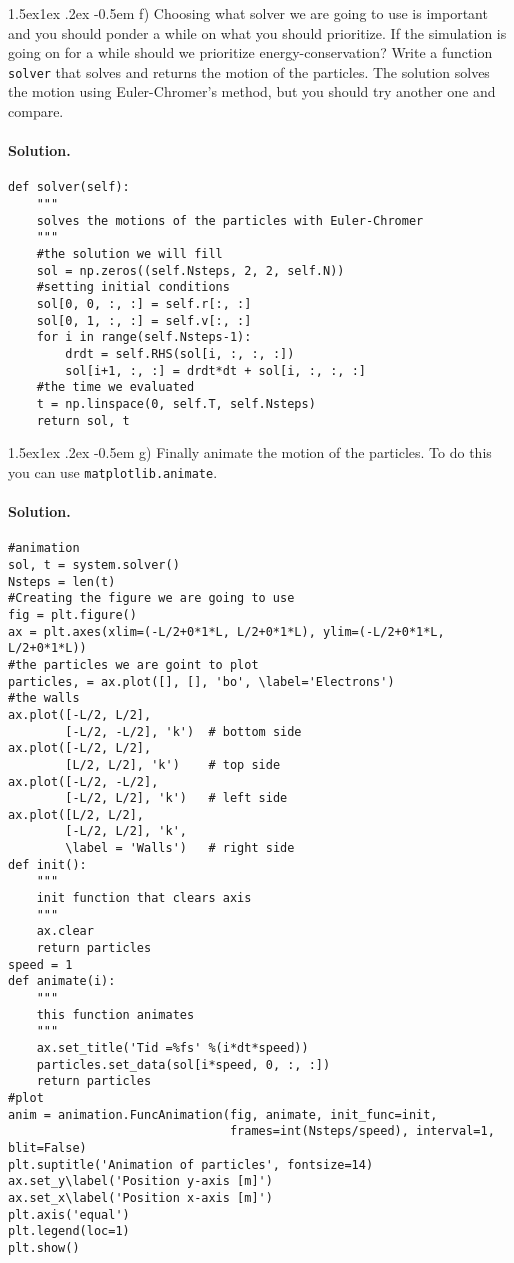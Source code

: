 \documentclass[%
oneside,                 %
final,                   %
10pt]{article}
\makeatletter
\newenvironment{doconceexercise}{}{}
\newcommand\subex{\@startsection{paragraph}{4}{\z@}%
                  {1.5ex\@plus1ex \@minus.2ex}%
                  {-0.5em}%
                  {\normalfont\normalsize\bfseries}}
\makeatother
\begin{document}
\begin{doconceexercise}

\subex{f)}
Choosing what solver we are going to use is important and you should ponder a while on what you should prioritize. If the simulation is going on for a while should we prioritize energy-conservation? Write a function \texttt{solver} that solves and returns the motion of the particles. The solution solves the motion using Euler-Chromer's method, but you should try another one and compare.


\paragraph{Solution.}
\begin{verbatim}
def solver(self):
    """
    solves the motions of the particles with Euler-Chromer
    """
    #the solution we will fill
    sol = np.zeros((self.Nsteps, 2, 2, self.N))
    #setting initial conditions
    sol[0, 0, :, :] = self.r[:, :]
    sol[0, 1, :, :] = self.v[:, :]
    for i in range(self.Nsteps-1):
        drdt = self.RHS(sol[i, :, :, :])
        sol[i+1, :, :] = drdt*dt + sol[i, :, :, :]
    #the time we evaluated
    t = np.linspace(0, self.T, self.Nsteps)
    return sol, t
\end{verbatim}


\subex{g)}
Finally animate the motion of the particles. To do this you can use \texttt{matplotlib.animate}.


\paragraph{Solution.}
\begin{verbatim}
#animation
sol, t = system.solver()
Nsteps = len(t)
#Creating the figure we are going to use
fig = plt.figure()
ax = plt.axes(xlim=(-L/2+0*1*L, L/2+0*1*L), ylim=(-L/2+0*1*L, L/2+0*1*L))
#the particles we are goint to plot
particles, = ax.plot([], [], 'bo', \label='Electrons')
#the walls
ax.plot([-L/2, L/2],
        [-L/2, -L/2], 'k')  # bottom side
ax.plot([-L/2, L/2],
        [L/2, L/2], 'k')    # top side
ax.plot([-L/2, -L/2],
        [-L/2, L/2], 'k')   # left side
ax.plot([L/2, L/2],
        [-L/2, L/2], 'k',
        \label = 'Walls')   # right side
def init():
    """
    init function that clears axis
    """
    ax.clear
    return particles
speed = 1
def animate(i):
    """
    this function animates
    """
    ax.set_title('Tid =%fs' %(i*dt*speed))
    particles.set_data(sol[i*speed, 0, :, :])
    return particles
#plot
anim = animation.FuncAnimation(fig, animate, init_func=init,
                               frames=int(Nsteps/speed), interval=1, blit=False)
plt.suptitle('Animation of particles', fontsize=14)
ax.set_y\label('Position y-axis [m]')
ax.set_x\label('Position x-axis [m]')
plt.axis('equal')
plt.legend(loc=1)
plt.show()
\end{verbatim}


\end{doconceexercise}
\end{document}
